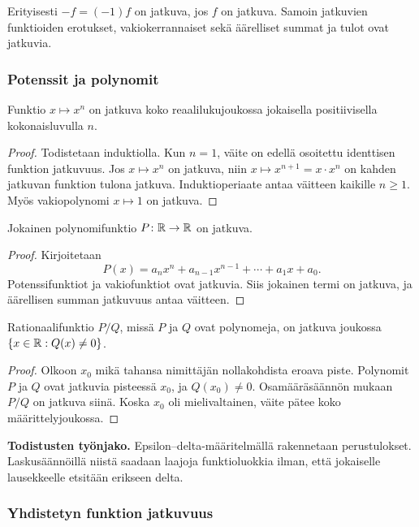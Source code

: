 \documentclass[11pt,a4paper]{amsart}
\begin{document}
Erityisesti $-f=(-1)f$ on jatkuva, jos $f$ on jatkuva.
Samoin jatkuvien funktioiden erotukset, vakiokerrannaiset sekä
äärelliset summat ja tulot ovat jatkuvia.

\newpage
\subsubsection*{Potenssit ja polynomit}

\begin{theorem}
  Funktio $x\mapsto x^n$ on jatkuva koko reaalilukujoukossa
  jokaisella positiivisella kokonaisluvulla $n$.
\end{theorem}
\begin{proof}
  Todistetaan induktiolla. Kun $n=1$, väite on edellä osoitettu
  identtisen funktion jatkuvuus. Jos $x\mapsto x^n$ on jatkuva,
  niin $x\mapsto x^{n+1}=x\cdot x^n$ on kahden jatkuvan funktion
  tulona jatkuva. Induktioperiaate antaa väitteen kaikille $n\ge1$.
  Myös vakiopolynomi $x\mapsto1$ on jatkuva.
\end{proof}

\begin{theorem}
  Jokainen polynomifunktio $P\colon\mathbb{R}\to\mathbb{R}$ on jatkuva.
\end{theorem}
\begin{proof}
  Kirjoitetaan
  \[
    P(x)=a_nx^n+a_{n-1}x^{n-1}+\cdots+a_1x+a_0.
  \]
  Potenssifunktiot ja vakiofunktiot ovat jatkuvia.
  Siis jokainen termi on jatkuva, ja äärellisen summan jatkuvuus
  antaa väitteen.
\end{proof}

\begin{corollary}
  Rationaalifunktio $P/Q$, missä $P$ ja $Q$ ovat polynomeja,
  on jatkuva joukossa $\{x\in\mathbb{R}:Q(x)\ne0\}$.
\end{corollary}
\begin{proof}
  Olkoon $x_0$ mikä tahansa nimittäjän nollakohdista eroava piste.
  Polynomit $P$ ja $Q$ ovat jatkuvia pisteessä $x_0$, ja
  $Q(x_0)\ne0$. Osamääräsäännön mukaan $P/Q$ on jatkuva siinä.
  Koska $x_0$ oli mielivaltainen, väite pätee koko määrittelyjoukossa.
\end{proof}

\medskip
\noindent\textbf{Todistusten työnjako.}
Epsilon--delta-määritelmällä rakennetaan perustulokset.
Laskusäännöillä niistä saadaan laajoja funktioluokkia ilman,
että jokaiselle lausekkeelle etsitään erikseen delta.

\subsubsection*{Yhdistetyn funktion jatkuvuus}
\end{document}
